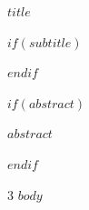 \documentclass[a4paper,landscape]{article}
\begin{document}
\fontsize{9}{10.5}\selectfont
\begin{center}
  {\color{courseblue}\fontsize{20}{21}\selectfont\bfseries $title$}\par
$if(subtitle)$
  \par
$endif$
\end{center}
\vspace{2pt}
$if(abstract)$
{\small\color{black!70}$abstract$\par}
\vspace{5pt}
$endif$

\begin{multicols*}{3}
$body$
\end{multicols*}
\end{document}
